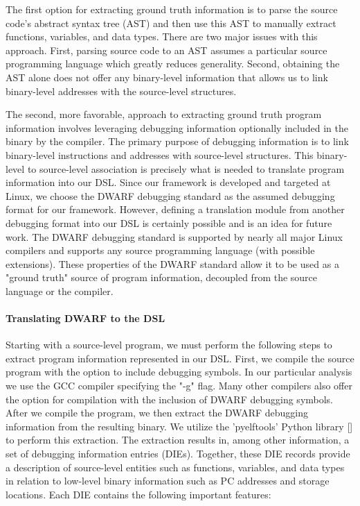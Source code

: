 \documentclass[conference]{IEEEtran}
\begin{document}
The first option for extracting ground truth information is to parse the source code's abstract syntax tree (AST) and then use this AST to manually extract functions, variables, and data types. There are two major issues with this approach. First, parsing source code to an AST assumes a particular source programming language which greatly reduces generality. Second, obtaining the AST alone does not offer any binary-level information that allows us to link binary-level addresses with the source-level structures.

The second, more favorable, approach to extracting ground truth program information involves leveraging debugging information optionally included in the binary by the compiler. The primary purpose of debugging information is to link binary-level instructions and addresses with source-level structures. This binary-level to source-level association is precisely what is needed to translate program information into our DSL. Since our framework is developed and targeted at Linux, we choose the DWARF debugging standard as the assumed debugging format for our framework. However, defining a translation module from another debugging format into our DSL is certainly possible and is an idea for future work. The DWARF debugging standard is supported by nearly all major Linux compilers and supports any source programming language (with possible extensions). These properties of the DWARF standard allow it to be used as a "ground truth" source of program information, decoupled from the source language or the compiler.

\paragraph{Translating DWARF to the DSL}

Starting with a source-level program, we must perform the following steps to extract program information represented in our DSL. First, we compile the source program with the option to include debugging symbols. In our particular analysis we use the GCC compiler specifying the "-g" flag. Many other compilers also offer the option for compilation with the inclusion of DWARF debugging symbols. After we compile the program, we then extract the DWARF debugging information from the resulting binary. We utilize the 'pyelftools' Python library [] to perform this extraction. The extraction results in, among other information, a set of debugging information entries (DIEs). Together, these DIE records provide a description of source-level entities such as functions, variables, and data types in relation to low-level binary information such as PC addresses and storage locations. Each DIE contains the following important features:
\end{document}
